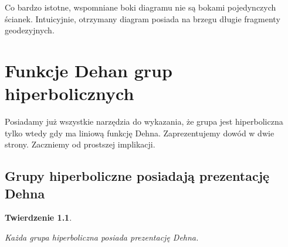 \documentclass[licencjacka]{pracamgr}
\newtheorem{ther}{Twierdzenie}[section]
\begin{document}
Co bardzo istotne, wspomniane boki diagramu nie są bokami pojedynczych ścianek. Intuicyjnie, otrzymany diagram posiada na brzegu długie fragmenty geodezyjnych.

\chapter{Funkcje Dehan grup hiperbolicznych}\label{Main proof}

Posiadamy już wszystkie narzędzia do wykazania, że grupa jest hiperboliczna tylko wtedy gdy ma liniową funkcję Dehna. Zaprezentujemy dowód w dwie strony. Zaczniemy od prostszej implikacji.

\section{Grupy hiperboliczne posiadają prezentację Dehna}

\begin{ther}\label{thm:hiper_linear}

Każda grupa hiperboliczna posiada prezentację Dehna.

\end{ther}
\end{document}
